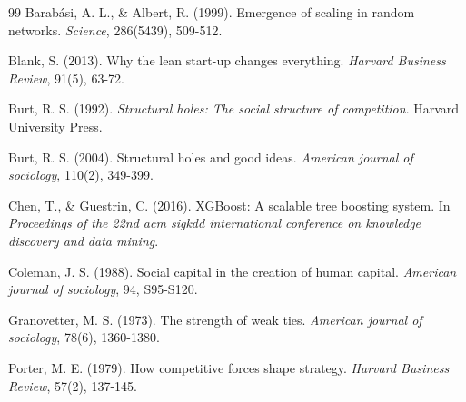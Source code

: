 \documentclass[11pt, a4paper]{article}
\begin{document}
\newpage
\begin{thebibliography}{99}
Barabási, A. L., \& Albert, R. (1999). Emergence of scaling in random networks. \textit{Science}, 286(5439), 509-512.

Blank, S. (2013). Why the lean start-up changes everything. \textit{Harvard Business Review}, 91(5), 63-72.

Burt, R. S. (1992). \textit{Structural holes: The social structure of competition}. Harvard University Press.

Burt, R. S. (2004). Structural holes and good ideas. \textit{American journal of sociology}, 110(2), 349-399.

Chen, T., \& Guestrin, C. (2016). XGBoost: A scalable tree boosting system. In \textit{Proceedings of the 22nd acm sigkdd international conference on knowledge discovery and data mining}.

Coleman, J. S. (1988). Social capital in the creation of human capital. \textit{American journal of sociology}, 94, S95-S120.

Granovetter, M. S. (1973). The strength of weak ties. \textit{American journal of sociology}, 78(6), 1360-1380.

Porter, M. E. (1979). How competitive forces shape strategy. \textit{Harvard Business Review}, 57(2), 137-145.

\end{thebibliography}
\end{document}
